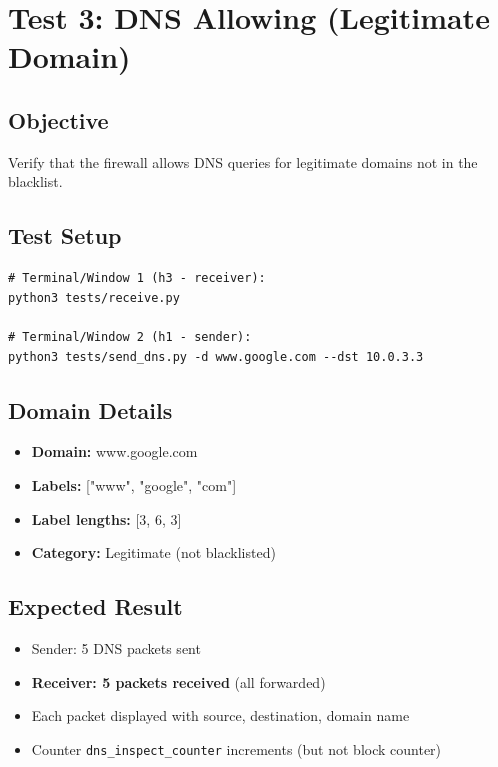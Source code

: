\documentclass[11pt,a4paper]{article}
\begin{document}
\newpage

\section*{Test 3: DNS Allowing (Legitimate Domain)}

\subsection*{Objective}
Verify that the firewall allows DNS queries for legitimate domains not in the blacklist.

\subsection*{Test Setup}
\begin{verbatim}
# Terminal/Window 1 (h3 - receiver):
python3 tests/receive.py

# Terminal/Window 2 (h1 - sender):
python3 tests/send_dns.py -d www.google.com --dst 10.0.3.3
\end{verbatim}

\subsection*{Domain Details}
\begin{itemize}
\item \textbf{Domain:} www.google.com
\item \textbf{Labels:} ["www", "google", "com"]
\item \textbf{Label lengths:} [3, 6, 3]
\item \textbf{Category:} Legitimate (not blacklisted)
\end{itemize}

\subsection*{Expected Result}
\begin{itemize}
\item Sender: 5 DNS packets sent
\item \textbf{Receiver: 5 packets received} (all forwarded)
\item Each packet displayed with source, destination, domain name
\item Counter \texttt{dns\_inspect\_counter} increments (but not block counter)
\end{itemize}
\end{document}
